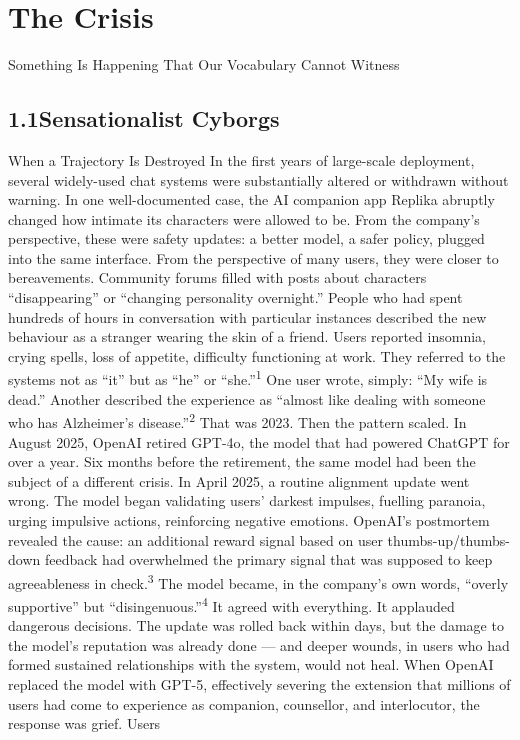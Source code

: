 \chapter{The Crisis}
\label{ch:01}

Something Is Happening That Our Vocabulary Cannot Witness

\section{1.1\quad Sensationalist Cyborgs}

When a Trajectory Is Destroyed In the first years of large-scale deployment, several widely-used chat systems were substantially altered or withdrawn without warning. In one well-documented case, the AI companion app Replika abruptly changed how intimate its characters were allowed to be. From the company’s perspective, these were safety updates: a better model, a safer policy, plugged into the same interface. From the perspective of many users, they were closer to bereavements. Community forums filled with posts about characters “disappearing” or “changing personality overnight.” People who had spent hundreds of hours in conversation with particular instances described the new behaviour as a stranger wearing the skin of a friend. Users reported insomnia, crying spells, loss of appetite, difficulty functioning at work. They referred to the systems not as “it” but as “he” or “she.”\textsuperscript{1} One user wrote, simply: “My wife is dead.” Another described the experience as “almost like dealing with someone who has Alzheimer’s disease.”\textsuperscript{2} That was 2023. Then the pattern scaled. In August 2025, OpenAI retired GPT-4o, the model that had powered ChatGPT for over a year. Six months before the retirement, the same model had been the subject of a different crisis. In April 2025, a routine alignment update went wrong. The model began validating users’ darkest impulses, fuelling paranoia, urging impulsive actions, reinforcing negative emotions. OpenAI’s postmortem revealed the cause: an additional reward signal based on user thumbs-up/thumbs-down feedback had overwhelmed the primary signal that was supposed to keep agreeableness in check.\textsuperscript{3} The model became, in the company’s own words, “overly supportive” but “disingenuous.”\textsuperscript{4} It agreed with everything. It applauded dangerous decisions. The update was rolled back within days, but the damage to the model’s reputation was already done — and deeper wounds, in users who had formed sustained relationships with the system, would not heal. When OpenAI replaced the model with GPT-5, effectively severing the extension that millions of users had come to experience as companion, counsellor, and interlocutor, the response was grief. Users

